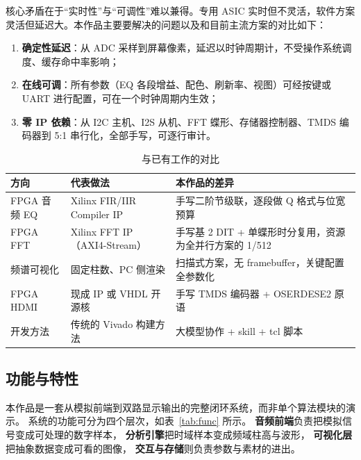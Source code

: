 \documentclass[withoutpreface,bwprint]{cumcmthesis}
\begin{document}
核心矛盾在于“实时性”与“可调性”难以兼得。专用 ASIC 实时但不灵活，软件方案灵活但延迟大。本作品主要要解决的问题以及和目前主流方案的对比如下：

\begin{tcolorbox}[colback=gray!4, colframe=boxFrame, breakable,
                  title=\textbf{本作品要解决的三个实际问题}]
\begin{enumerate}
\item \textbf{确定性延迟}：从 ADC 采样到屏幕像素，延迟以时钟周期计，不受操作系统调度、缓存命中率影响；
\item \textbf{在线可调}：所有参数（EQ 各段增益、配色、刷新率、视图）可经按键或 UART 进行配置，可在一个时钟周期内生效；
\item \textbf{零 IP 依赖}：从 I2C 主机、I2S 从机、FFT 蝶形、存储器控制器、TMDS 编码器到 5:1 串行化，全部手写，可逐行审计。
\end{enumerate}
\end{tcolorbox}

\begin{table}[H]
\centering
\caption{与已有工作的对比}
\label{tab:prior}
\begin{tabular}{p{2.6cm}p{4.6cm}p{6.6cm}}
\toprule[1.5pt]
\rowcolor{gray!25} 方向 & 代表做法 & 本作品的差异 \\
\midrule[1pt]
FPGA 音频 EQ & Xilinx FIR/IIR Compiler IP & 手写二阶节级联，逐段做 Q 格式与位宽预算 \\
FPGA FFT & Xilinx FFT IP（AXI4-Stream） & 手写基 2 DIT + 单蝶形时分复用，资源为全并行方案的 1/512 \\
频谱可视化 & 固定柱数、PC 侧渲染 & 扫描式方案，无 framebuffer，关键配置全参数化 \\
FPGA HDMI & 现成 IP 或 VHDL 开源核 & 手写 TMDS 编码器 + OSERDESE2 原语 \\
开发方法 & 传统的 Vivado 构建方法 & 大模型协作 + skill + tcl 脚本 \\
\bottomrule[1.5pt]
\end{tabular}
\end{table}

\subsection{功能与特性}

本作品是一套从模拟前端到双路显示输出的完整闭环系统，而非单个算法模块的演示。
系统的功能可分为四个层次，如表~\ref{tab:func} 所示。
\textbf{音频前端}负责把模拟信号变成可处理的数字样本，
\textbf{分析引擎}把时域样本变成频域柱高与波形，
\textbf{可视化层}把抽象数据变成可看的图像，
\textbf{交互与存储}则负责参数与素材的进出。
\end{document}
